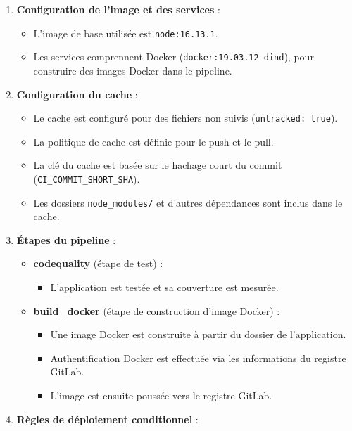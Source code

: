 \documentclass[a4paper, 11pt]{report}
\begin{document}
\begin{enumerate}
\def\labelenumi{\arabic{enumi}.}
\tightlist
\item
  \textbf{Configuration de l'image et des services} :

  \begin{itemize}
  \tightlist
  \item
    L'image de base utilisée est \texttt{node:16.13.1}.
  \item
    Les services comprennent Docker (\texttt{docker:19.03.12-dind}),
    pour construire des images Docker dans le pipeline.
  \end{itemize}
\item
  \textbf{Configuration du cache} :

  \begin{itemize}
  \tightlist
  \item
    Le cache est configuré pour des fichiers non suivis
    (\texttt{untracked:\ true}).
  \item
    La politique de cache est définie pour le push et le pull.
  \item
    La clé du cache est basée sur le hachage court du commit
    (\texttt{CI\_COMMIT\_SHORT\_SHA}).
  \item
    Les dossiers \texttt{node\_modules/} et d'autres dépendances sont
    inclus dans le cache.
  \end{itemize}
\item
  \textbf{Étapes du pipeline} :

  \begin{itemize}
  \tightlist
  \item
    \textbf{codequality} (étape de test) :

    \begin{itemize}
    \tightlist
    \item
      L'application est testée et sa couverture est mesurée.
    \end{itemize}
  \item
    \textbf{build\_docker} (étape de construction d'image Docker) :

    \begin{itemize}
    \tightlist
    \item
      Une image Docker est construite à partir du dossier de
      l'application.
    \item
      Authentification Docker est effectuée via les informations du
      registre GitLab.
    \item
      L'image est ensuite poussée vers le registre GitLab.
    \end{itemize}
  \end{itemize}
\item
  \textbf{Règles de déploiement conditionnel} :


\end{enumerate}
\end{document}
